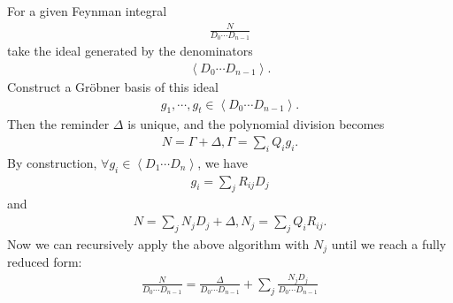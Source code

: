 \documentclass[10pt]{article}
\begin{document}
For a given Feynman integral
\begin{eqnarray} \nonumber
\frac{N}{D_0 \cdots D_{n-1}}
\end{eqnarray}
take the ideal generated by the denominators
\begin{eqnarray} \nonumber
\left< D_0 \cdots D_{n-1} \right>.
\end{eqnarray}
Construct a Gr\"obner basis of this ideal
\begin{eqnarray} \nonumber
g_1, \cdots, g_t \in \left< D_0 \cdots D_{n-1} \right>.
\end{eqnarray}
Then the reminder $\Delta$ is unique, and the polynomial division becomes
\begin{eqnarray} \nonumber
N = \Gamma + \Delta, \Gamma = \sum_i Q_i g_i.
\end{eqnarray}
By construction, $\forall g_i \in \left< D_1 \cdots D_n \right>$, we have
\begin{eqnarray} \nonumber
g_i = \sum_j R_{ij} D_j
\end{eqnarray}
and
\begin{eqnarray} \nonumber
N = \sum_j N_j D_j + \Delta, N_j = \sum_j Q_i R_{ij}.
\end{eqnarray}
Now we can recursively apply the above algorithm with $N_j$ until we reach a fully reduced form:
\begin{eqnarray} \nonumber
\frac{N}{D_0 \cdots D_{n-1}}
=
\frac{\Delta}{D_0 \cdots D_{n-1}}
+
\sum_j \frac{ N_j D_j}{D_0 \cdots D_{n-1}}
\end{eqnarray}
\end{document}
